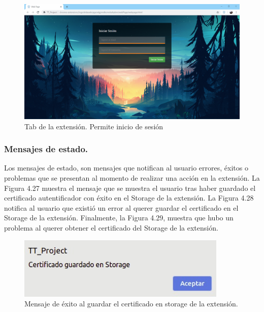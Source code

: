\documentclass[12pt, a4paper, titlepage]{report}
\begin{document}
    		    \begin{figure}[H]
    				\begin{center}	\includegraphics[width=15cm]{./imagenes/Desarrollo/Prototipo_2/UI_webpage.PNG}
    					\caption{Tab de la extensión. Permite inicio de sesión}
    				\end{center}
    			\end{figure}
    			
    			\subsubsection{Mensajes de estado.}
    			Los mensajes de estado, son mensajes que notifican al usuario errores, éxitos o problemas que se presentan al momento de realizar una acción en la extensión. La Figura 4.27 muestra el mensaje que se muestra el usuario tras haber guardado el certificado autentificador con éxito en el Storage de la extensión. La Figura 4.28 notifica al usuario que existió un error al querer guardar el certificado en el Storage de la extensión. Finalmente, la Figura 4.29, muestra que hubo un problema al querer obtener el certificado del Storage de la extensión. 
    			
    			\begin{figure}[H]
    				\begin{center}	\includegraphics[width=10cm]{./imagenes/Desarrollo/Prototipo_2/UI_certSavedInStorage.jpeg}
    					\caption[Mensaje de éxito]{Mensaje de éxito al guardar el certificado en storage de la extensión.}
    				\end{center}
    			\end{figure}
    			\label{UI_certSavedInStorage}
    			
\end{document}
